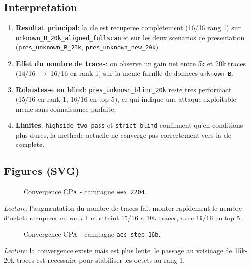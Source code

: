 \subsection{Interpretation}
\begin{enumerate}
\item \textbf{Resultat principal}: la cle est recuperee completement (16/16 rang 1) sur \texttt{unknown\_B\_20k\_aligned\_fullscan} et sur les deux scenarios de presentation (\texttt{pres\_unknown\_B\_20k}, \texttt{pres\_unknown\_new\_20k}).
\item \textbf{Effet du nombre de traces}: on observe un gain net entre 5k et 20k traces (14/16 $\rightarrow$ 16/16 en rank-1) sur la meme famille de donnees \texttt{unknown\_B}.
\item \textbf{Robustesse en blind}: \texttt{pres\_unknown\_blind\_20k} reste tres performant (15/16 en rank-1, 16/16 en top-5), ce qui indique une attaque exploitable meme sans connaissance parfaite.
\item \textbf{Limites}: \texttt{highside\_two\_pass} et \texttt{strict\_blind} confirment qu'en conditions plus dures, la methode actuelle ne converge pas correctement vers la cle complete.
\end{enumerate}

\subsection{Figures (SVG)}

\begin{figure}[h]
\centering

\caption{Convergence CPA - campagne \texttt{aes\_2204}.}
\label{fig:conv-aes2204}
\end{figure}

\noindent
\textit{Lecture}: l'augmentation du nombre de traces fait monter rapidement le nombre d'octets recuperes en rank-1 et atteint 15/16 a 10k traces, avec 16/16 en top-5.

\begin{figure}[h]
\centering

\caption{Convergence CPA - campagne \texttt{aes\_step\_16b}.}
\label{fig:conv-aesstep16b}
\end{figure}

\noindent
\textit{Lecture}: la convergence existe mais est plus lente; le passage au voisinage de 15k-20k traces est necessaire pour stabiliser les octets au rang 1.


